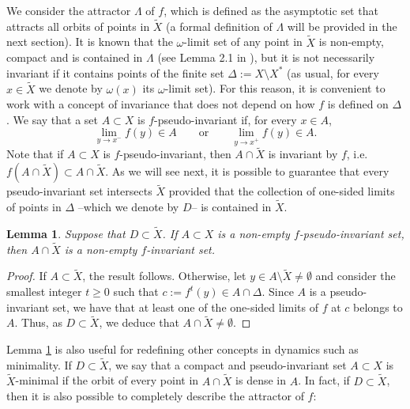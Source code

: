 \documentclass[a4paper]{article}
\newtheorem{lemma}[theorem]{Lemma}
\begin{document}
We consider the attractor $\Lambda$ of $f$, which is defined as the asymptotic set that attracts all orbits of points in $\widetilde X$ (a formal definition of $\Lambda$ will be provided in the next section). It is known that the $\omega$-limit set of any point in $\widetilde X$ is non-empty, compact and is contained in $\Lambda$ (see Lemma 2.1 in \cite{CCG21}), but it is not necessarily invariant if it contains points of the finite set $\Delta:=X\setminus X^*$ (as usual, for every $x\in \widetilde X$ we denote by $\omega(x)$ its $\omega$-limit set). For this reason, it is convenient to work with a concept of invariance that does not depend on how $f$ is defined on $\Delta$. We say that a set $A\subset X$ is $f$-pseudo-invariant if, for every $x\in A$,
\[
    \lim_{y\to x^-}f(y)\in A\qquad\text{or}\qquad \lim_{y\to x^+}f(y)\in A.
\]
Note that if $A \subset X$ is $f$-pseudo-invariant, then $A \cap \widetilde X$ is invariant by $f$, i.e. $f(A \cap \widetilde X)\subset A \cap \widetilde X$. As we will see next, it is possible to guarantee that every pseudo-invariant set intersects $\widetilde X$ provided that the collection of one-sided limits of points in $\Delta$ --which we denote by $D$-- is contained in $\widetilde X$. 

\begin{lemma}\label{CAP.TILDE}
    Suppose that $D\subset\widetilde X$. If $A \subset X$ is a non-empty $f$-pseudo-invariant set, then $A\cap\widetilde X$ is a non-empty $f$-invariant set.
\end{lemma}
\begin{proof}
    If $A\subset \widetilde X$, the result follows. Otherwise, let $y\in A\setminus\widetilde X\neq\emptyset$ and consider the smallest integer $t\geq0$ such that $c:=f^t(y)\in A\cap\Delta$. Since $A$ is a pseudo-invariant set, we have that at least one of the one-sided limits of $f$ at $c$ belongs to $A$. Thus, as $D\subset \widetilde X$, we deduce that $A\cap\widetilde X\neq\emptyset$.
\end{proof}

Lemma \ref{CAP.TILDE} is also useful for redefining other concepts in dynamics such as mi\-ni\-ma\-li\-ty. If $D\subset\widetilde X$, we say that a compact and pseudo-invariant set $A\subset X$ is $\widetilde X$-minimal if the orbit of every point in $A\cap\widetilde X$ is dense in $A$. In fact, if $D\subset\widetilde X$, then it is also possible to completely describe the attractor of $f$:
\end{document}

